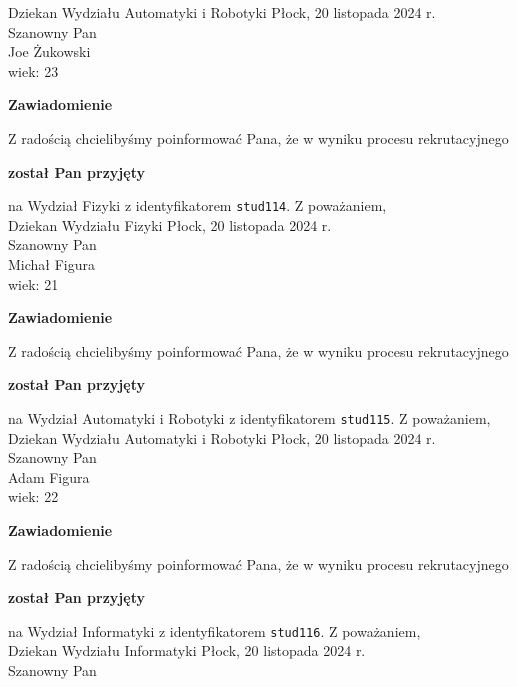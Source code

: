 \documentclass[12pt,a4paper]{article}
\begin{document}
Dziekan
Wydziału Automatyki i Robotyki
\newpage
\hfill Płock, 20 listopada 2024 r.\\
\noindent 
Szanowny Pan \\
Joe Żukowski \\
wiek: 23
\bigskip
\begin{center}
 	{\Large\textbf{Zawiadomienie}}
\end{center}
\bigskip
Z radością chcielibyśmy poinformować Pana, że w wyniku procesu rekrutacyjnego 
\begin{center}
\textsf{\textbf{został Pan przyjęty}} 
\end{center}
na Wydział Fizyki z identyfikatorem \verb|stud114|. 
\vspace{2cm}
\noindent
Z poważaniem,\\
Dziekan
Wydziału Fizyki
\newpage
\hfill Płock, 20 listopada 2024 r.\\
\noindent 
Szanowny Pan \\
Michał Figura \\
wiek: 21
\bigskip
\begin{center}
 	{\Large\textbf{Zawiadomienie}}
\end{center}
\bigskip
Z radością chcielibyśmy poinformować Pana, że w wyniku procesu rekrutacyjnego 
\begin{center}
\textsf{\textbf{został Pan przyjęty}} 
\end{center}
na Wydział Automatyki i Robotyki z identyfikatorem \verb|stud115|. 
\vspace{2cm}
\noindent
Z poważaniem,\\
Dziekan
Wydziału Automatyki i Robotyki
\newpage
\hfill Płock, 20 listopada 2024 r.\\
\noindent 
Szanowny Pan \\
Adam Figura \\
wiek: 22
\bigskip
\begin{center}
 	{\Large\textbf{Zawiadomienie}}
\end{center}
\bigskip
Z radością chcielibyśmy poinformować Pana, że w wyniku procesu rekrutacyjnego 
\begin{center}
\textsf{\textbf{został Pan przyjęty}} 
\end{center}
na Wydział Informatyki z identyfikatorem \verb|stud116|. 
\vspace{2cm}
\noindent
Z poważaniem,\\
Dziekan
Wydziału Informatyki
\newpage
\hfill Płock, 20 listopada 2024 r.\\
\noindent 
Szanowny Pan \\
\end{document}
